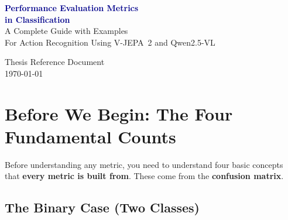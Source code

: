\documentclass[12pt, a4paper]{article}
\begin{document}
\begin{titlepage}
\centering
\vspace*{2cm}

{\Huge\bfseries\textcolor{darkblue}{Performance Evaluation Metrics}}\\[0.8cm]
{\Huge\bfseries\textcolor{darkblue}{in Classification}}\\[1.5cm]

{\Large\textcolor{medblue}{A Complete Guide with Examples}}\\[0.5cm]
{\large\textcolor{medblue}{For Action Recognition Using V-JEPA~2 and Qwen2.5-VL}}\\[3cm]


\vfill
{\large Thesis Reference Document}\\[0.3cm]
{\large\today}
\end{titlepage}

\tableofcontents
\newpage

\section{Before We Begin: The Four Fundamental Counts}

Before understanding any metric, you need to understand four basic concepts that \textbf{every metric is built from}. These come from the \textbf{confusion matrix}.

\subsection{The Binary Case (Two Classes)}
\end{document}
